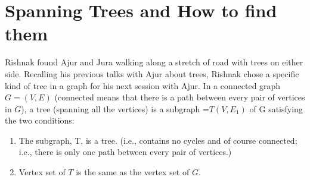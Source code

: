 \chapter{Spanning Trees and How to find them}
Rishnak found Ajur and Jura walking along a stretch of road with trees on either side. Recalling his previous talks with Ajur about trees, Rishnak chose a specific kind of tree in a graph for his next session with Ajur.
In a connected graph $G=(V,E)$ (connected means that there is a path between every pair of vertices in $G$), a tree (spanning all the vertices) is a subgraph =$T(V,E_1)$ of G satisfying the two conditions:
\begin{enumerate}
    \item The subgraph, T,  is a tree. (i.e., contains no cycles and of course connected; i.e., there is only one path between every pair of vertices.)
    \item Vertex set of $T$ is the same as the vertex set of $G$.
\end{enumerate}

